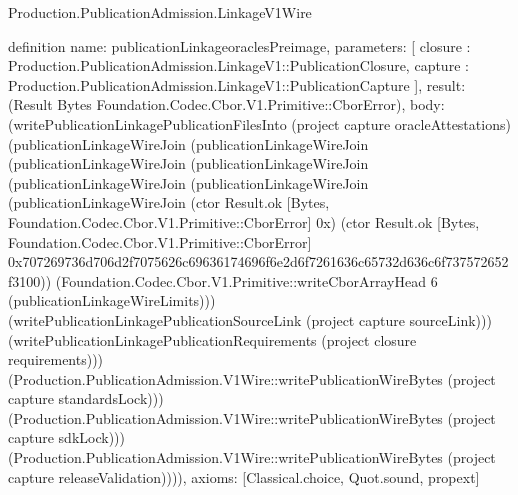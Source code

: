 \begin{lexlean}{Production.PublicationAdmission.LinkageV1Wire}
\begin{semanticmodule}
definition{
  name: publicationLinkageoraclesPreimage,
  parameters: [
    closure : Production.PublicationAdmission.LinkageV1::PublicationClosure,
    capture : Production.PublicationAdmission.LinkageV1::PublicationCapture
  ],
  result: (Result Bytes Foundation.Codec.Cbor.V1.Primitive::CborError),
  body: (writePublicationLinkagePublicationFilesInto (project capture oracleAttestations) (publicationLinkageWireJoin (publicationLinkageWireJoin (publicationLinkageWireJoin (publicationLinkageWireJoin (publicationLinkageWireJoin (publicationLinkageWireJoin (publicationLinkageWireJoin (ctor Result.ok [Bytes, Foundation.Codec.Cbor.V1.Primitive::CborError] 0x) (ctor Result.ok [Bytes, Foundation.Codec.Cbor.V1.Primitive::CborError] 0x707269736d706d2f7075626c69636174696f6e2d6f7261636c65732d636c6f737572652f3100)) (Foundation.Codec.Cbor.V1.Primitive::writeCborArrayHead 6 (publicationLinkageWireLimits))) (writePublicationLinkagePublicationSourceLink (project capture sourceLink))) (writePublicationLinkagePublicationRequirements (project closure requirements))) (Production.PublicationAdmission.V1Wire::writePublicationWireBytes (project capture standardsLock))) (Production.PublicationAdmission.V1Wire::writePublicationWireBytes (project capture sdkLock))) (Production.PublicationAdmission.V1Wire::writePublicationWireBytes (project capture releaseValidation)))),
  axioms: [Classical.choice, Quot.sound, propext]
}


\end{semanticmodule}
\end{lexlean}
